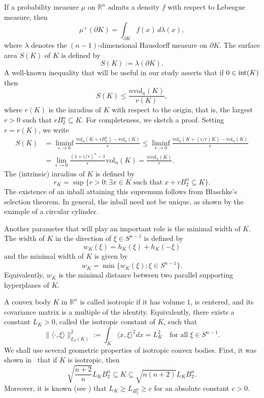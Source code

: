 \documentclass[11pt,leqno]{article}
\theoremstyle{remark}
\numberwithin{equation}{section}
\newcommand{\vol}{\mathrm{vol}}
\newcommand{\ls}{\leqslant}
\newcommand{\gr}{\geqslant}
\begin{document}
If a probability measure $\mu$ on $\mathbb{R}^n$ admits a density $f$ with respect to Lebesgue measure, then
$$\mu^+(\partial K)=\int_{\partial K}f(x)\,d\lambda(x),$$
where $\lambda $ denotes the $(n-1)$-dimensional Hausdorff measure on $\partial K$. 
The surface area $S(K)$ of $K$ is defined by
$$S(K):=\lambda (\partial K).$$
A well-known inequality that will be useful in our study asserts that if $0\in {\rm int}(K)$ then 
\begin{equation}\label{eq:surface-inradius}
S(K)\ls\frac{n\vol_n(K)}{r(K)},
\end{equation}
where $r(K)$ is the inradius of $K$ with respect to the origin, that is, the largest $r>0$ such that $rB_2^n\subseteq K$.
For completeness, we sketch a proof. Setting $r=r(K)$, we write
\begin{align*}
S(K) &=\liminf_{\epsilon\to 0}\frac{\vol_n(K+\epsilon B_2^n)-\vol_n(K)}{\epsilon}\ls \liminf_{\epsilon\to 0}\frac{\vol_n(K+(\epsilon /r)K)-\vol_n(K)}{\epsilon}\\
&=\lim_{\epsilon\to 0}\frac{(1+\epsilon/r)^n-1}{\epsilon }\vol_n(K)=\frac{n\vol_n(K)}{r}.
\end{align*}
The (intrinsic) inradius of $K$ is defined by
$$r_K=\sup\{r>0:\exists x\in K\;\text{such that}\;x+rB_2^n\subseteq K\}.$$
The existence of an inball attaining this supremum follows from Blaschke's selection theorem. In general, the inball
need not be unique, as shown by the example of a circular cylinder.

Another parameter that will play an important role is the minimal width of $K$. The width of $K$ in the direction of $\xi\in S^{n-1}$ is defined by
$$w_K(\xi)=h_K(\xi)+h_K(-\xi)$$
and the minimal width of $K$ is given by 
$$w_K=\min\{w_K(\xi):\xi\in S^{n-1}\}.$$
Equivalently, $w_K$ is the minimal distance between two parallel supporting hyperplanes of $K$.
 
A convex body $K$ in ${\mathbb R}^n$ is called isotropic if it has volume $1$, is centered, and its covariance matrix is a multiple of the identity. 
Equivalently, there exists a constant $L_K>0$, called the isotropic constant of $K$, such that
\begin{equation*}
\|\langle \cdot ,\xi\rangle\|_{L_2(K)}^2:=\int_K\langle x,\xi\rangle^2dx =L_K^2\quad\text{for all}\;\xi\in S^{n-1}.
\end{equation*}
We shall use several geometric properties of isotropic convex bodies. 
First, it was shown in~\cite{Kannan-Lovasz-Simonovits-1995} that if $K$ is isotropic, then
\begin{equation}\label{eq:KLS-radius}
\sqrt{\frac{n+2}{n}}L_KB_2^n \subseteq K \subseteq \sqrt{n(n+2)}L_KB_2^n.
\end{equation}
Moreover, it is known (see \cite[Proposition~3.3.1]{BGVV-book}) that $L_K\gr L_{B_2^n}\gr c$ for an absolute constant $c>0$. 
\end{document}
